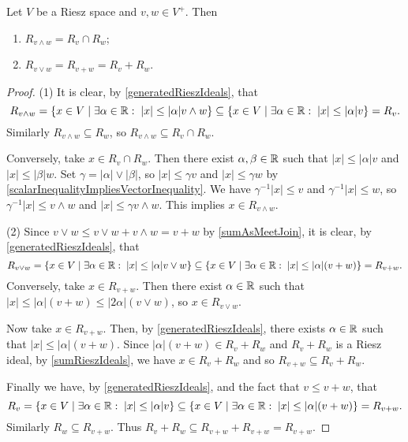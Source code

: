 \begin{proposition} \label{latticePropertiesPrincipalRieszIdeals}
Let $V$ be a Riesz space and $v,w\in V^+$. Then
\begin{enumerate}
\item $R_{v\wedge w} = R_v \cap R_w$;
\item $R_{v\vee w} = R_{v+w} = R_v + R_w$.
\end{enumerate}
\end{proposition}
\begin{proof}
(1) It is clear, by \ref{generatedRieszIdeals}, that
\[ R_{v\wedge w} = \setbuilder{x\in V}{\exists \alpha\in \R: \; |x|\leq |\alpha| v\wedge w} \subseteq \setbuilder{x\in V}{\exists \alpha\in \R: \; |x|\leq |\alpha| v} = R_v. \]
Similarly $R_{v\wedge w} \subseteq R_w$, so $R_{v\wedge w} \subseteq R_v \cap R_w$.

Conversely, take $x\in R_v \cap R_w$. Then there exist $\alpha, \beta\in\mathbb{R}$ such that $|x| \leq |\alpha| v$ and $|x|\leq |\beta| w$. Set $\gamma = |\alpha|\vee|\beta|$, so $|x| \leq \gamma v$ and $|x|\leq \gamma w$ by \ref{scalarInequalityImpliesVectorInequality}. We have $\gamma^{-1}|x| \leq v$ and $\gamma^{-1}|x| \leq w$, so $\gamma^{-1}|x| \leq v\wedge w$ and $|x| \leq \gamma v\wedge w$. This implies $x\in R_{v\wedge w}$.

(2) Since $v\vee w \leq v\vee w + v\wedge w = v+w$ by \ref{sumAsMeetJoin}, it is clear, by \ref{generatedRieszIdeals}, that
\[ R_{v\vee w} = \setbuilder{x\in V}{\exists \alpha\in \R: \; |x|\leq |\alpha| v\vee w} \subseteq \setbuilder{x\in V}{\exists \alpha\in \R: \; |x|\leq |\alpha| (v+w)} = R_{v+w}. \]
Conversely, take $x\in R_{v+w}$. Then there exist $\alpha\in\mathbb{R}$ such that $|x| \leq |\alpha| (v+w) \leq |2\alpha|(v\vee w)$, so $x\in R_{v\vee w}$.

Now take $x\in R_{v+w}$. Then, by \ref{generatedRieszIdeals}, there exists $\alpha \in \mathbb{R}$ such that $|x| \leq |\alpha|(v+w)$. Since $|\alpha|(v+w) \in R_v + R_w$ and $R_v + R_w$ is a Riesz ideal, by \ref{sumRieszIdeals}, we have $x\in R_v+R_w$ and so $R_{v+w} \subseteq R_v+R_w$.

Finally we have, by \ref{generatedRieszIdeals}, and the fact that $v \leq v+w$, that
\[ R_{v} = \setbuilder{x\in V}{\exists \alpha\in \R: \; |x|\leq |\alpha| v} \subseteq \setbuilder{x\in V}{\exists \alpha\in \R: \; |x|\leq |\alpha| (v+w)} = R_{v+w}. \]
Similarly $R_w \subseteq R_{v+w}$. Thus $R_v + R_w \subseteq R_{v+w} + R_{v+w} = R_{v+w}$.
\end{proof}

